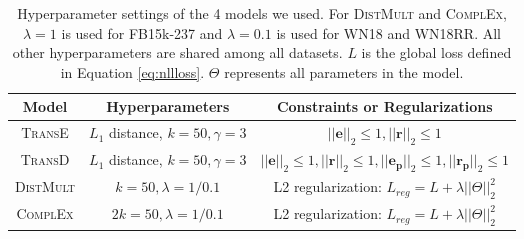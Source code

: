 \begin{table*}[t]
\centering
\begin{tabular}{|c|c|c|}
\hline
\textbf{Model} & \textbf{Hyperparameters} & \textbf{Constraints or Regularizations}  \\ \hline
\textsc{TransE} & $L_1$ distance, $k=50, \gamma=3$ & $||\mathbf{e}||_2\leq 1,||\mathbf{r}||_2\leq 1$ \\ \hline
\textsc{TransD} & $L_1$ distance, $k=50, \gamma=3$ & $||\mathbf{e}||_2\leq 1,||\mathbf{r}||_2\leq 1,||\mathbf{e_p}||_2\leq 1,||\mathbf{r_p}||_2\leq 1$  \\ \hline
\textsc{DistMult} & $k=50, \lambda=1/0.1$ & L2 regularization: $L_{reg}=L+\lambda||\Theta||_2^2$ \\ \hline
\textsc{ComplEx}  & $2k=50, \lambda=1/0.1$ & L2 regularization: $L_{reg}=L+\lambda||\Theta||_2^2$ \\ \hline
\end{tabular}
\caption{Hyperparameter settings of the 4 models we used. For \textsc{DistMult} and \textsc{ComplEx}, $\lambda=1$ is used for FB15k-237 and $\lambda=0.1$ is used for WN18 and WN18RR. All other hyperparameters are shared among all datasets. $L$ is the global loss defined in Equation \eqref{eq:nllloss}. $\Theta$ represents all parameters in the model.}
\label{tab:hyperparams}
\end{table*}
